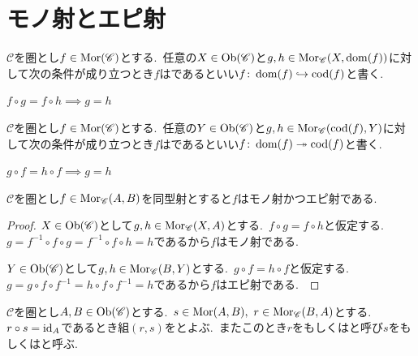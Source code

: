 
\section{モノ射とエピ射}

\begin{definition} \label{def: IsMonomorphism}
$\mathscr{C}$を圏とし$f \in \operatorname{Mor}(\mathscr{C})$とする.\
任意の$X \in \operatorname{Ob}(\mathscr{C})$と$g, h \in \operatorname{Mor}_{\mathscr{C}}(X, \operatorname{dom}(f))$に対して次の条件が成り立つとき$f$はであるといい$f \colon \operatorname{dom}(f) \hookrightarrow \operatorname{cod}(f)$と書く.
\begin{center}
    $f \circ g = f \circ h \implies g = h$
\end{center}
\end{definition}

\begin{definition} \label{def: IsEpimorphism}
$\mathscr{C}$を圏とし$f \in \operatorname{Mor}(\mathscr{C})$とする.\
任意の$Y \in \operatorname{Ob}(\mathscr{C})$と$g, h \in \operatorname{Mor}_{\mathscr{C}}(\operatorname{cod}(f), Y)$に対して次の条件が成り立つとき$f$はであるといい$f \colon \operatorname{dom}(f) \twoheadrightarrow \operatorname{cod}(f)$と書く.
\begin{center}
    $g \circ f = h \circ f \implies g = h$
\end{center}
\end{definition}

\begin{proposition} \label{prop: mono_and_epi_of_iso}
$\mathscr{C}$を圏とし$f \in \operatorname{Mor}_{\mathscr{C}}(A, B)$を同型射とすると$f$はモノ射かつエピ射である.\
\end{proposition}

\begin{proof}
$X \in \operatorname{Ob}(\mathscr{C})$として$g, h \in \operatorname{Mor}_{\mathscr{C}}(X, A)$とする.\
$f \circ g = f \circ h$と仮定する.\
$g = f^{-1} \circ f \circ g =  f^{-1} \circ f \circ h = h$であるから$f$はモノ射である.\

$Y \in \operatorname{Ob}(\mathscr{C})$として$g, h \in \operatorname{Mor}_{\mathscr{C}}(B, Y)$とする.\
$g \circ f = h \circ f$と仮定する.\
$g = g \circ f \circ f^{-1} = h \circ f \circ f^{-1} = h$であるから$f$はエピ射である.\
\end{proof}

\begin{definition} \label{def: IsRetractionSectionPair}
$\mathscr{C}$を圏とし$A,B \in \operatorname{Ob}(\mathscr{C})$とする.\
$s \in \operatorname{Mor}(A, B),\ r \in \operatorname{Mor}_{\mathscr{C}}(B, A)$とする.\
$r \circ s = \operatorname{id}_{A}$であるとき組$(r,s)$をとよぶ.\
またこのとき$r$をもしくはと呼び$s$をもしくはと呼ぶ.
\end{definition}

